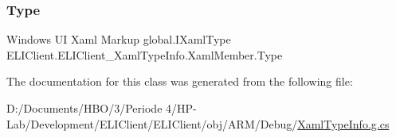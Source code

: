 \mbox{\label{class_e_l_i_client_1_1_e_l_i_client___xaml_type_info_1_1_xaml_member_a98412c6f1729ec230ac2a495196ddebe}} 
\subsubsection{\texorpdfstring{Type}{Type}}
{\footnotesize\ttfamily Windows UI Xaml Markup global.\+I\+Xaml\+Type E\+L\+I\+Client.\+E\+L\+I\+Client\+\_\+\+Xaml\+Type\+Info.\+Xaml\+Member.\+Type\hspace{0.3cm}{\ttfamily [get]}}



The documentation for this class was generated from the following file\+:\begin{DoxyCompactItemize}
\item 
D\+:/\+Documents/\+H\+B\+O/3/\+Periode 4/\+H\+P-\/\+Lab/\+Development/\+E\+L\+I\+Client/\+E\+L\+I\+Client/obj/\+A\+R\+M/\+Debug/\hyperlink{_e_l_i_client_2_e_l_i_client_2obj_2_a_r_m_2_debug_2_xaml_type_info_8g_8cs}{Xaml\+Type\+Info.\+g.\+cs}\end{DoxyCompactItemize}
